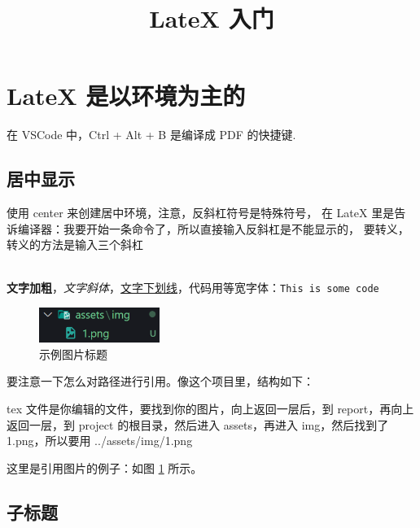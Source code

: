 \documentclass[14pt,a4paper,UTF8,twoside]{article}
\title{LateX 入门}
\begin{document}
\maketitle %

\section{LateX 是以环境为主的}

在 VSCode 中，Ctrl + Alt + B 是编译成 PDF 的快捷键.

\subsection{居中显示}

\begin{center}
    使用 center 来创建居中环境，注意，反斜杠符号是特殊符号，
    在 LateX 里是告诉编译器：我要开始一条命令了，所以直接输入反斜杠是不能显示的，
    要转义，转义的方法是输入三个斜杠 \\\
\end{center}

\textbf{文字加粗}，\textit{文字斜体}，\underline{文字下划线}，代码用等宽字体：\texttt{This is some code}


\begin{figure} [H]
    \centering %
    \includegraphics[width=0.35\textwidth]{../assets/img/1.png} %
    \caption{示例图片标题}
    \label{fig:my_label} %
\end{figure}

要注意一下怎么对路径进行引用。像这个项目里，结构如下：

% 


tex 文件是你编辑的文件，要找到你的图片，向上返回一层后，到 report，再向上返回一层，到 project 的根目录，然后进入 assets，再进入 img，然后找到了 1.png，所以要用 ../assets/img/1.png

这里是引用图片的例子：如图 \ref{fig:my_label} 所示。 %

\subsection{子标题}
\end{document}
